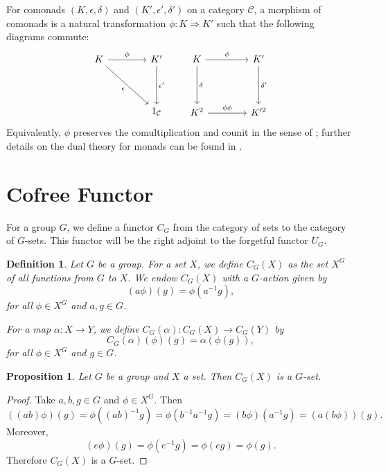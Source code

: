 \documentclass{amsart}
\newtheorem{proposition}{Proposition}
\newtheorem{definition}{Definition}
\begin{document}
For comonads $(K,\epsilon,\delta)$ and $(K',\epsilon',\delta')$ on a category $\mathcal{C}$, a morphism of comonads is a natural transformation $\phi\colon K \Rightarrow K'$ such that the following diagrams commute:
\[
\begin{tikzcd}[column sep=4em, row sep=4em]
K \ar[r, "\phi"] \ar[dr, "\epsilon"'] & K' \ar[d, "\epsilon'"] \\
& 1_{\mathcal{C}}
\end{tikzcd}
\qquad
\begin{tikzcd}[column sep=4em, row sep=4em]
K \ar[r, "\phi"] \ar[d, "\delta"] & K' \ar[d, "\delta'"] \\
K^2 \ar[r, "\phi\phi"] & K'^2
\end{tikzcd}
\]
Equivalently, $\phi$ preserves the comultiplication and counit in the sense of \cite{bohm2008monads}; further details on the dual theory for monads can be found in \cite{borceux1994handbook}.

\section{Cofree Functor}
\label{sec:cofree}

For a group $G$, we define a functor $C_G$ from the category of sets to the category of $G$-sets. This functor will be the right adjoint to the forgetful functor $U_G$.

\begin{definition}
Let $G$ be a group. For a set $X$, we define $C_G(X)$ as the set $X^G$ of all functions from $G$ to $X$. We endow $C_G(X)$ with a $G$-action given by
\[
(a\phi)(g) = \phi(a^{-1}g),
\]
for all $\phi \in X^G$ and $a, g \in G$.

For a map $\alpha \colon X \longrightarrow Y$, we define $C_G(\alpha) \colon C_G(X) \longrightarrow C_G(Y)$ by
\[
C_G(\alpha)(\phi)(g) = \alpha(\phi(g)),
\]
for all $\phi \in X^G$ and $g \in G$.
\end{definition}

\begin{proposition}\label{prop:cofree_Gset}
Let $G$ be a group and $X$ a set. Then $C_G(X)$ is a $G$-set.
\end{proposition}

\begin{proof}
Take $a, b, g \in G$ and $\phi \in X^G$. Then
\[
((ab)\phi)(g) = \phi((ab)^{-1}g) = \phi(b^{-1}a^{-1}g) = (b\phi)(a^{-1}g) = (a(b\phi))(g).
\]
Moreover,
\[
(e\phi)(g) = \phi(e^{-1}g) = \phi(eg) = \phi(g).
\]
Therefore $C_G(X)$ is a $G$-set.
\end{proof}
\end{document}

